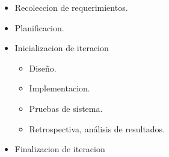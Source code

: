 \begin{itemize}
	\itemsep1pt \parskip1pt 
	\item Recoleccion de requerimientos.
	\item Planificacion.
	\item Inicializacion de iteracion
	\begin{itemize}
		\item Diseño.
		\item Implementacion.
		\item Pruebas de sistema.
		\item Retrospectiva, análisis de resultados.
	\end{itemize}
	\item Finalizacion de iteracion
\end{itemize}